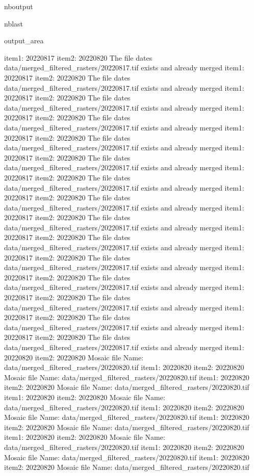 \documentclass[letterpaper,10pt]{sphinxmanual}
\begin{document}
\begin{sphinxuseclass}{nboutput}
\begin{sphinxuseclass}{nblast}
{\begin{sphinxuseclass}{output_area}
\begin{sphinxuseclass}{}
\begin{sphinxVerbatim}[commandchars=\\\{\}]
item1:  20220817
item2:  20220820
The file dates data/merged\_filtered\_rasters/20220817.tif exists and already merged
item1:  20220817
item2:  20220820
The file dates data/merged\_filtered\_rasters/20220817.tif exists and already merged
item1:  20220817
item2:  20220820
The file dates data/merged\_filtered\_rasters/20220817.tif exists and already merged
item1:  20220817
item2:  20220820
The file dates data/merged\_filtered\_rasters/20220817.tif exists and already merged
item1:  20220817
item2:  20220820
The file dates data/merged\_filtered\_rasters/20220817.tif exists and already merged
item1:  20220817
item2:  20220820
The file dates data/merged\_filtered\_rasters/20220817.tif exists and already merged
item1:  20220817
item2:  20220820
The file dates data/merged\_filtered\_rasters/20220817.tif exists and already merged
item1:  20220817
item2:  20220820
The file dates data/merged\_filtered\_rasters/20220817.tif exists and already merged
item1:  20220817
item2:  20220820
The file dates data/merged\_filtered\_rasters/20220817.tif exists and already merged
item1:  20220817
item2:  20220820
The file dates data/merged\_filtered\_rasters/20220817.tif exists and already merged
item1:  20220817
item2:  20220820
The file dates data/merged\_filtered\_rasters/20220817.tif exists and already merged
item1:  20220817
item2:  20220820
The file dates data/merged\_filtered\_rasters/20220817.tif exists and already merged
item1:  20220817
item2:  20220820
The file dates data/merged\_filtered\_rasters/20220817.tif exists and already merged
item1:  20220817
item2:  20220820
The file dates data/merged\_filtered\_rasters/20220817.tif exists and already merged
item1:  20220817
item2:  20220820
The file dates data/merged\_filtered\_rasters/20220817.tif exists and already merged
item1:  20220820
item2:  20220820
Mosaic file Name:  data/merged\_filtered\_rasters/20220820.tif
item1:  20220820
item2:  20220820
Mosaic file Name:  data/merged\_filtered\_rasters/20220820.tif
item1:  20220820
item2:  20220820
Mosaic file Name:  data/merged\_filtered\_rasters/20220820.tif
item1:  20220820
item2:  20220820
Mosaic file Name:  data/merged\_filtered\_rasters/20220820.tif
item1:  20220820
item2:  20220820
Mosaic file Name:  data/merged\_filtered\_rasters/20220820.tif
item1:  20220820
item2:  20220820
Mosaic file Name:  data/merged\_filtered\_rasters/20220820.tif
item1:  20220820
item2:  20220820
Mosaic file Name:  data/merged\_filtered\_rasters/20220820.tif
item1:  20220820
item2:  20220820
Mosaic file Name:  data/merged\_filtered\_rasters/20220820.tif
item1:  20220820
item2:  20220820
Mosaic file Name:  data/merged\_filtered\_rasters/20220820.tif

\end{sphinxVerbatim}
\end{sphinxuseclass}
\end{sphinxuseclass}}
\end{sphinxuseclass}
\end{sphinxuseclass}
\end{document}
